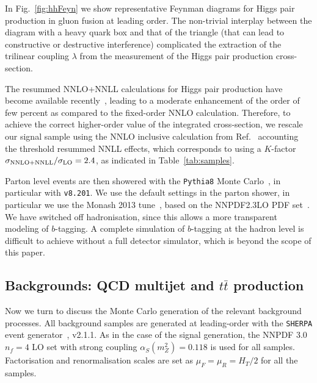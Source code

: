 In Fig.~\ref{fig:hhFeyn} we show representative Feynman diagrams
    for Higgs pair production in gluon fusion at
    leading order.
    The non-trivial interplay between the diagram with a heavy quark box
    and that of the triangle (that can lead to constructive or destructive interference)
    complicated the extraction of
    the trilinear coupling
    $\lambda$ from the measurement of the Higgs pair
    production cross-section.

The resummed NNLO+NNLL calculations for Higgs pair production have become available recently~\cite{deFlorian:2015moa},
leading to a moderate enhancement of the order of
few percent as compared to the fixed-order NNLO calculation.
%
Therefore, to achieve the correct higher-order value of the  integrated cross-section,
we rescale our signal sample using the
NNLO inclusive calculation from Ref.~\cite{deFlorian:2013jea} accounting the threshold resummed
NNLL effects, which corresponds to using a $K$-factor $\sigma_{\rm NNLO+NNLL}/\sigma_{\rm LO}=2.4$, as indicated
in Table~\ref{tab:samples}.


%
Parton level events are then showered with the {\tt Pythia8} Monte
Carlo~\cite{Sjostrand:2007gs,Sjostrand:2014zea}, in particular with {\tt v8.201}.
%
We use the default settings in the parton shower, in particular
we use the Monash 2013 tune~\cite{Skands:2014pea}, based on the NNPDF2.3LO PDF set~\cite{Ball:2012cx}.
%
We have switched off hadronisation, since this allows a more transparent modeling of
$b$-tagging.
%
A complete simulation of $b$-tagging at the hadron level is difficult to achieve without a full
detector simulator, which is beyond the scope of this paper.

\subsection{Backgrounds: QCD multijet and $t\bar{t}$ production}

Now we turn to discuss the Monte Carlo generation of the relevant background processes.
%
All background samples are generated at leading-order
with the {\tt SHERPA} event generator~\cite{Gleisberg:2008ta}, v2.1.1.
%
As in the case of the signal generation, the NNPDF 3.0 $n_f = 4$ LO set with strong coupling
$\alpha_S(m_Z^2)=0.118$ is used for all samples.
%
Factorisation and renormalisation scales are set as $\mu_F=\mu_R=H_T/2$ for all
the samples.

